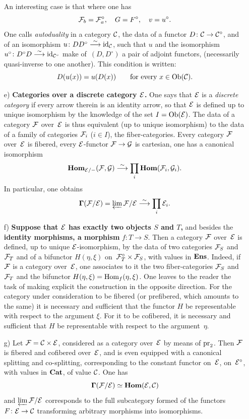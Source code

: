 \begin{enumerate}
An interesting case is that where one has
$$
\cal{F}_b=\cal{F}_a^\circ,\quad G=F^\circ,\quad v=u^\circ.
$$
One calls \emph{autoduality}
in a category $\cal{C}$, the
data of a functor $D\colon \cal{C}\to\cal{C}^\circ$, and of an
isomorphism $u\colon DD^\circ\isomto\id_{\cal{C}}$, such that $u$ and
the isomorphism $u^\circ\colon D^\circ D\isomto\id_{\cal{C}^\circ}$
make of~$(D,D^\circ)$ a pair of adjoint functors,
(necessarily quasi-inverse to one another). This condition
is written:
$$
D(u(x))=u(D(x))\qquad \text{for every $x\in\Ob(\cal{C})$.}
$$
\item[e)]
\textbf{Categories over a discrete category $\cal{E}$.} One says that $\cal{E}$ is a
\emph{discrete category} if every arrow therein is an
identity arrow, so that $\cal{E}$ is defined up to
unique isomorphism by the knowledge of the set
$I=\Ob(\cal{E})$. The data of a category $\cal{F}$
over~$\cal{E}$ is thus equivalent (up to unique isomorphism)
to the data of a family of categories
$\cal{F}_i$ ($i\in I$), the fiber-categories. Every category
$\cal{F}$ over~$\cal{E}$ is fibered, every $\cal{E}$-functor
$\cal{F}\to\cal{G}$ is cartesian, one has a canonical isomorphism
$$ \SheafHom_{\cal{E}/-}(\cal{F},\cal{G}) \isomto
\prod_{i}\SheafHom(\cal{F}_i,\cal{G}_i).
$$
In particular, one obtains
$$
\mathbf{\Gamma}(\cal{F}/\cal{E})=\varprojLim\cal{F}/\cal{E}\isomto\prod_{i} \cal{E}_i.
$$
\item[f)] \textbf{Suppose that $\cal{E}$ has exactly two objects
$S$ and $T$,} and besides the \textbf{identity morphisms, a
morphism }$f\colon T\to S$. Then a category $\cal{F}$
over~$\cal{E}$ is defined, up to unique $\cal{E}$-isomorphism,
by the data of two categories $\cal{F}_S$
and $\cal{F}_T$ and of a bifunctor $H(\eta,\xi)$ on~$\cal{F}_T^\circ\times\cal{F}_S$, with values in $\Ens$. Indeed,
if~$\cal{F}$ is a category over~$\cal{E}$, one associates to it
the two fiber-categories $\cal{F}_S$ and~$\cal{F}_T$ and
the bifunctor $H(\eta,\xi)=\Hom_f(\eta,\xi)$. One leaves to the reader the
task of making explicit the construction in the opposite direction. For the
category under consideration to be fibered (or prefibered,
which amounts to the same) it is necessary and sufficient that the functor $H$ be
representable with respect to the argument $\xi$. For it
to be cofibered, it is necessary and sufficient that $H$ be
representable with respect to the argument~$\eta$.
\item[g)] Let $\cal{F}=\cal{C}\times\cal{E}$, considered
as a category over~$\cal{E}$ by means of
$\pr_2$. Then $\cal{F}$ is fibered and cofibered over~$\cal{E}$,
and is even equipped with a canonical splitting and co-splitting,
corresponding to the constant functor on~$\cal{E}$, \resp on~$\cal{E}^\circ$, with values in $\Cat$, of value $\cal{C}$. One has
$$
\mathbf{\Gamma}(\cal{F}/\cal{E})\simeq\SheafHom(\cal{E},\cal{C})
$$
and
$\varprojLim\cal{F}/\cal{E}$ corresponds to the
full subcategory formed of the functors
$F\colon\cal{E\to\cal{C}}$ transforming arbitrary morphisms into
isomorphisms.
\end{enumerate}

